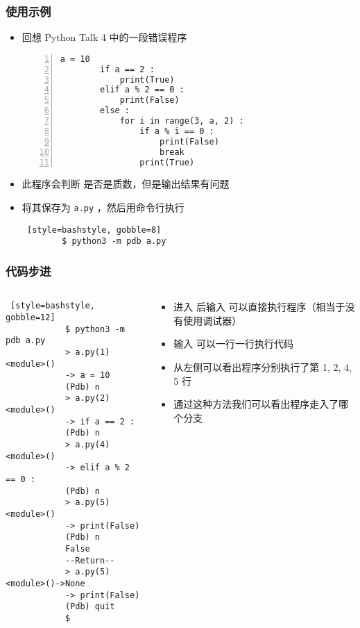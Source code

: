 \begin{CJK}{UTF8}{gbsn}
\begin{frame} [fragile]
	\frametitle{使用示例}
	\begin{itemize}
	\item 回想 Python Talk 4 中的一段错误程序
		{\small
		\begin{lstlisting}[style=pythonstyle, gobble=8, frame=single, 
							numbers=left, numberstyle=\ttfamily]
		a = 10
		if a == 2 :
			print(True)
		elif a % 2 == 0 :
			print(False)
		else :
			for i in range(3, a, 2) :
				if a % i == 0 :
					print(False)
					break
				print(True)
		\end{lstlisting}
		}
	\item 此程序会判断  是否是质数，但是输出结果有问题
	\item 将其保存为 \texttt{a.py} ，然后用命令行执行
		\begin{lstlisting} [style=bashstyle, gobble=8]
		$ python3 -m pdb a.py
		\end{lstlisting}
	\end{itemize}
\end{frame}

\begin{frame} [fragile]
	\frametitle{代码步进}
	\begin{columns}[T]
		\begin{column}[T]{.5\textwidth}
			{\small
			\begin{lstlisting} [style=bashstyle, gobble=12]
			$ python3 -m pdb a.py
			> a.py(1)<module>()
			-> a = 10
			(Pdb) n
			> a.py(2)<module>()
			-> if a == 2 :
			(Pdb) n
			> a.py(4)<module>()
			-> elif a % 2 == 0 :
			(Pdb) n
			> a.py(5)<module>()
			-> print(False)
			(Pdb) n
			False
			--Return--
			> a.py(5)<module>()->None
			-> print(False)
			(Pdb) quit
			$ 
			\end{lstlisting}
			}
		\end{column}
		\begin{column}[T]{.5\textwidth}
			\linespread{1.5}
			\begin{itemize}
			\item 进入  后输入 
					可以直接执行程序（相当于没有使用调试器）
			\item 输入  可以一行一行执行代码
			\item 从左侧可以看出程序分别执行了第 1, 2, 4, 5 行
			\item 通过这种方法我们可以看出程序走入了哪个分支
			\end{itemize}
		\end{column}
	\end{columns}
\end{frame}


\end{CJK}
